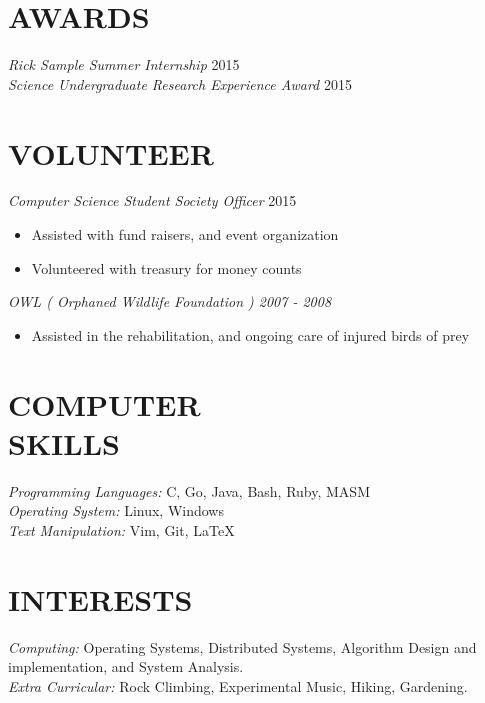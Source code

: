 \documentclass[line,margin]{res}
\begin{document}
\begin{resume}
\section{AWARDS}
{\sl Rick Sample Summer Internship} \hfill 2015\\
{\sl Science Undergraduate Research Experience Award} \hfill 2015\\


\section{VOLUNTEER}
{\sl Computer Science Student Society Officer} \hfill 2015
    \begin{itemize}
        \item Assisted with fund raisers, and event organization
        \item Volunteered with treasury for money counts
    \end{itemize}

{\sl OWL ( Orphaned Wildlife Foundation ) {\hfill 2007 - 2008}
    \begin{itemize}
         \item Assisted in the rehabilitation, and ongoing care of injured birds of prey
    \end{itemize}
}
    

\section{COMPUTER \\ SKILLS} 
	{\sl Programming Languages:} C, Go, Java, Bash, Ruby, MASM\\
	{\sl Operating System:} Linux, Windows\\
	{\sl Text Manipulation:} Vim, Git, \LaTeX \\

\section{INTERESTS}
	{\sl Computing:} Operating Systems, Distributed Systems, Algorithm Design and implementation, and System Analysis.\\
	{\sl Extra Curricular:} Rock Climbing, Experimental Music, Hiking, Gardening.\\

\end{resume}
\end{document}

